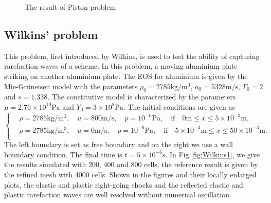 \documentclass{article}
\numberwithin{equation}{section}
\numberwithin{table}{section}
\begin{document}
\begin{figure}
	  \caption{ The result of Piston problem}
	  \label{fig:piston1}
	\end{figure}

\subsection{Wilkins' problem}
This problem, first introduced by Wilkins, is used to test the  ability of capturing rarefaction waves of a scheme. In this problem, a moving aluminium plate striking on another aluminium plate. The EOS for aluminium is given by the Mie-Gr\"uneisen model with the parameters $\rho_0 = 2785 \text{kg}/\text{m}^3$, $ a_0 = 5328 \text{m} /\text{s}$, $\Gamma_0 =2$ and $s = 1.338$. The constitutive model is characterized by the parameters $\mu = 2.76\times 10^{10} \text{Pa}$ and $Y_0 = 3\times 10^8 \text{Pa}$. The initial conditions are given as
\begin{equation}
  \left\{ \begin{aligned}
	&  \rho = 2785 \text{kg}/\text{m}^3, \quad  u = 800\text{m}/\text{s}, \quad  p = 10^{-6}\text{Pa}, \quad  \text{if} \quad  0\text{m} \le x \le 5\times 10^{-3} \text{m},\\
	&  \rho = 2785 \text{kg}/\text{m}^3, \quad  u = 0\text{m}/\text{s}, \quad  p = 10^{-6}\text{Pa}, \quad  \text{if}  \quad  5 \times 10^{-3}\text{m} \le x \le 50\times 10^{-3} \text{m}.\\
	\end{aligned}
  \right.
\end{equation}
The left boundary is set as free boundary and on  the right we use a wall boundary condition. The final time is $t =5\times 10^{-6} \text{s}$. In Fig.\ref{fig:Wilkins1}, we give the results  simulated with 200, 400 and 800 cells, the reference result is given by the refined mesh with 4000 cells. Shown in the figures and their locally enlarged plots, the elastic and plastic right-going shocks and the reflected elastic and plastic rarefaction waves are well resolved without numerical oscillation.
\end{document}
